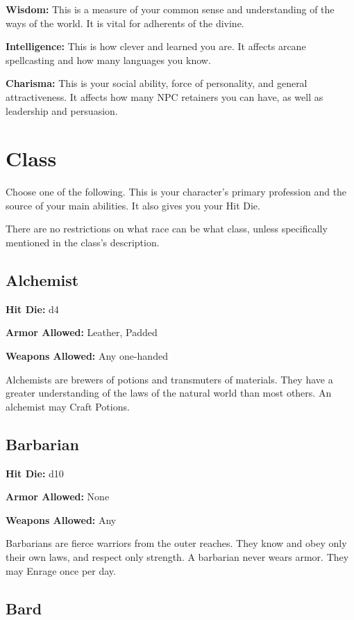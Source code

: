 \begin{multicols}{2}
\textbf{Wisdom:} This is a measure of your common sense and understanding of the
ways of the world. It is vital for adherents of the divine.

\textbf{Intelligence:} This is how clever and learned you are. It affects arcane
spellcasting and how many languages you know.

\textbf{Charisma:} This is your social ability, force of personality, and general
attractiveness. It affects how many NPC retainers you can have, as well as
leadership and persuasion.

\section{Class}

Choose one of the following. This is your character's primary profession and
the source of your main abilities. It also gives you your Hit Die.

There are no restrictions on what race can be what class, unless specifically
mentioned in the class's description.

\subsection{Alchemist}

\textbf{Hit Die:} d4

\textbf{Armor Allowed:} Leather, Padded

\textbf{Weapons Allowed:} Any one-handed

Alchemists are brewers of potions and transmuters of materials. They have a
greater understanding of the laws of the natural world than most others. An
alchemist may Craft Potions.

\subsection{Barbarian}

\textbf{Hit Die:} d10

\textbf{Armor Allowed:} None

\textbf{Weapons Allowed:} Any

Barbarians are fierce warriors from the outer reaches. They know and obey
only their own laws, and respect only strength. A barbarian never wears
armor. They may Enrage once per day.

\subsection{Bard}


\end{multicols}
